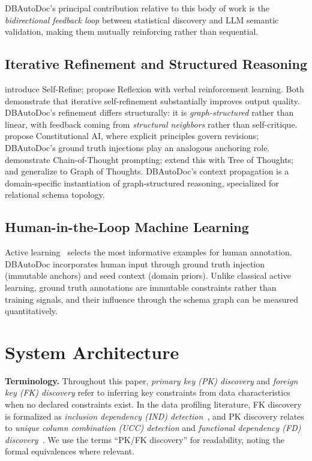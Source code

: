 \documentclass[twocolumn]{svjour3}
\begin{document}
DBAutoDoc's principal contribution relative to this body of work is the \emph{bidirectional feedback loop} between statistical discovery and LLM semantic validation, making them mutually reinforcing rather than sequential.

\subsection{Iterative Refinement and Structured Reasoning}

\cite{madaan2023selfrefine} introduce Self-Refine; \cite{shinn2023reflexion} propose Reflexion with verbal reinforcement learning. Both demonstrate that iterative self-refinement substantially improves output quality. DBAutoDoc's refinement differs structurally: it is \emph{graph-structured} rather than linear, with feedback coming from \emph{structural neighbors} rather than self-critique. \cite{bai2022constitutional} propose Constitutional AI, where explicit principles govern revisions; DBAutoDoc's ground truth injections play an analogous anchoring role. \cite{wei2022cot} demonstrate Chain-of-Thought prompting; \cite{yao2023tot} extend this with Tree of Thoughts; and \cite{besta2024got} generalize to Graph of Thoughts. DBAutoDoc's context propagation is a domain-specific instantiation of graph-structured reasoning, specialized for relational schema topology.

\subsection{Human-in-the-Loop Machine Learning}

Active learning~\cite{settles2009active} selects the most informative examples for human annotation. DBAutoDoc incorporates human input through ground truth injection (immutable anchors) and seed context (domain priors). Unlike classical active learning, ground truth annotations are immutable constraints rather than training signals, and their influence through the schema graph can be measured quantitatively.


\section{System Architecture}\label{sec:architecture}

\textbf{Terminology.} Throughout this paper, \emph{primary key (PK) discovery} and \emph{foreign key (FK) discovery} refer to inferring key constraints from data characteristics when no declared constraints exist. In the data profiling literature, FK discovery is formalized as \emph{inclusion dependency (IND) detection}~\cite{papenbrock2015binder,dursch2019ind}, and PK discovery relates to \emph{unique column combination (UCC) detection} and \emph{functional dependency (FD) discovery}~\cite{huhtala1999tane,papenbrock2016hyfd}. We use the terms ``PK/FK discovery'' for readability, noting the formal equivalences where relevant.
\end{document}
